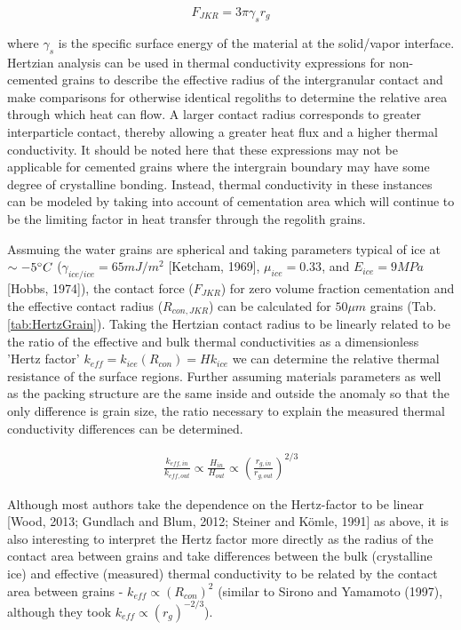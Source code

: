 \documentclass[11pt]{article} %
\begin{document}
	 \begin{equation}
	 F_{JKR} = 3 \pi \gamma_{s} r_{g}
	 \end{equation} 
	 
	 where $\gamma_{s}$ is the specific surface energy of the material at the solid/vapor interface. Hertzian analysis can be used in thermal conductivity expressions for non-cemented grains to describe the effective radius of the intergranular contact and make comparisons for otherwise identical regoliths to determine the relative area through which heat can flow. A larger contact radius corresponds to greater interparticle contact, thereby allowing a greater heat flux and a higher thermal conductivity. It should be noted here that these expressions may not be applicable for cemented grains where the intergrain boundary may have some degree of crystalline bonding. Instead, thermal conductivity in these instances can be modeled by taking into account of cementation area which will continue to be the limiting factor in heat transfer through the regolith grains. 

	Assmuing the water grains are spherical and taking parameters typical of ice at $\sim-5\degree C$ ($\gamma_{ice/ice} = 65 mJ/m^{2}$ [Ketcham, 1969], $\mu_{ice} = 0.33$, and $E_{ice} = 9 MPa$ [Hobbs, 1974]), the contact force ($F_{JKR}$) for zero volume fraction cementation and the effective contact radius ($R_{con,JKR}$) can be calculated for $50 \mu m$ grains (Tab.\ref{tab:HertzGrain}). Taking the Hertzian contact radius to be linearly related to be the ratio of the effective and bulk thermal conductivities as a dimensionless 'Hertz factor' $k_{eff} = k_{ice}(R_{con}) = H k_{ice}$ we can determine the relative thermal resistance of the surface regions. Further assuming materials parameters as well as the packing structure are the same inside and outside the anomaly so that the only difference is grain size, the ratio necessary to explain the measured thermal conductivity differences can be determined. 
	
	\begin{align*}
	\frac{k_{eff,in}}{k_{eff,out}} \varpropto \frac{H_{in}}{H_{out}} \varpropto \left( \frac{r_{g,in}}{r_{g,out}} \right)^{2/3}
	\end{align*}
	
	Although most authors take the dependence on the Hertz-factor to be linear [Wood, 2013; Gundlach and Blum, 2012; Steiner and K\"{o}mle, 1991] as above, it is also interesting to interpret the Hertz factor more directly as the radius of the contact area between grains and take differences between the bulk (crystalline ice) and effective (measured) thermal conductivity to be related by the contact area between grains  - $k_{eff} \varpropto (R_{con})^{2}$ (similar to Sirono and Yamamoto (1997), although they took $k_{eff} \varpropto (r_{g})^{-2/3}$). 
	
\end{document}
